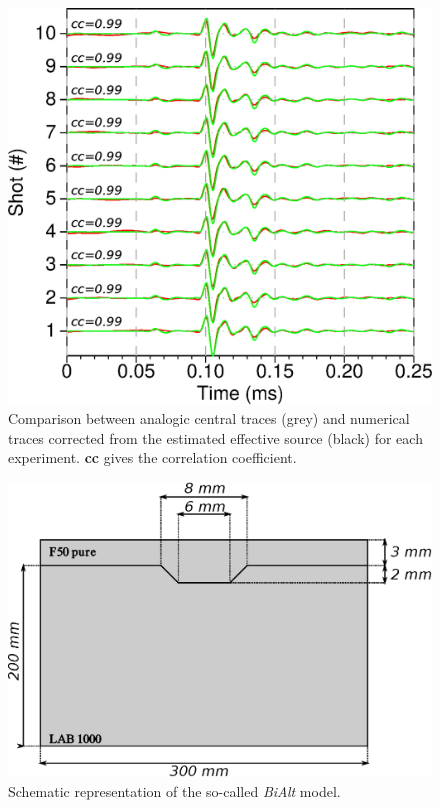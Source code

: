 \documentclass[manuscript,revised]{geophysics}
\begin{document}
\begin{figure}[!h]
	\centering
	\includegraphics[scale=0.5]{fig/spec_F50_CT_COMP.eps}
	\caption{Comparison between analogic central traces (grey) and numerical traces corrected from the estimated effective source (black) for each experiment. \textbf{cc} gives the correlation coefficient.}
	\label{panel_srcest_2d_mean_comp}
\end{figure}

\begin{figure}[!h]
	\centering
	\includegraphics[scale=0.5]{fig/bialt_model.eps}
	\caption{Schematic representation of the so-called \textit{BiAlt} model.}
	\label{panel_bialt_model}
\end{figure}
\end{document}
